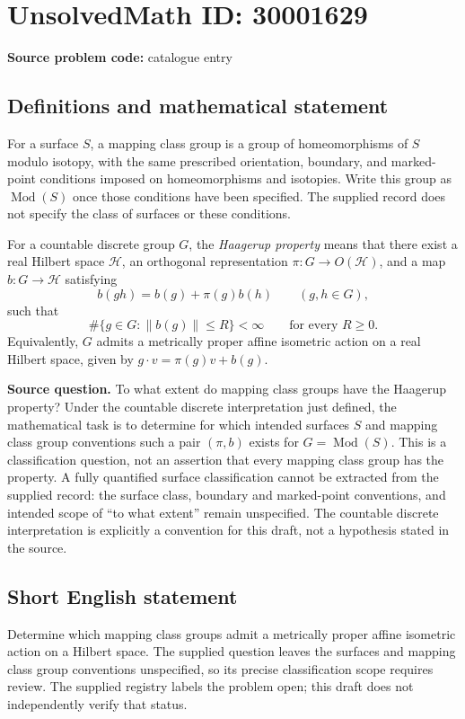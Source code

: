 \documentclass[11pt]{article}
\begin{document}
\section*{UnsolvedMath ID: 30001629}
\textbf{Source problem code:} catalogue entry
\subsection{Definitions and mathematical statement}
For a surface \(S\), a mapping class group is a group of homeomorphisms of \(S\) modulo isotopy, with the same prescribed orientation, boundary, and marked-point conditions imposed on homeomorphisms and isotopies. Write this group as \(\operatorname{Mod}(S)\) once those conditions have been specified. The supplied record does not specify the class of surfaces or these conditions.

For a countable discrete group \(G\), the \emph{Haagerup property} means that there exist a real Hilbert space \(\mathcal H\), an orthogonal representation \(\pi:G\to O(\mathcal H)\), and a map \(b:G\to\mathcal H\) satisfying
\[
 b(gh)=b(g)+\pi(g)b(h)\qquad(g,h\in G),
\]
such that
\[
 \#\{g\in G:\|b(g)\|\le R\}<\infty
 \qquad\text{for every }R\ge0.
\]
Equivalently, \(G\) admits a metrically proper affine isometric action on a real Hilbert space, given by \(g\cdot v=\pi(g)v+b(g)\).

\textbf{Source question.} To what extent do mapping class groups have the Haagerup property? Under the countable discrete interpretation just defined, the mathematical task is to determine for which intended surfaces \(S\) and mapping class group conventions such a pair \((\pi,b)\) exists for \(G=\operatorname{Mod}(S)\). This is a classification question, not an assertion that every mapping class group has the property. A fully quantified surface classification cannot be extracted from the supplied record: the surface class, boundary and marked-point conventions, and intended scope of ``to what extent'' remain unspecified. The countable discrete interpretation is explicitly a convention for this draft, not a hypothesis stated in the source.
\subsection{Short English statement}
Determine which mapping class groups admit a metrically proper affine isometric action on a Hilbert space. The supplied question leaves the surfaces and mapping class group conventions unspecified, so its precise classification scope requires review. The supplied registry labels the problem open; this draft does not independently verify that status.
\end{document}
